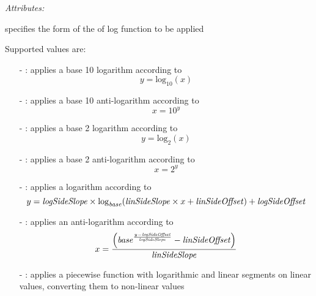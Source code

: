 \emph{Attributes:}
\begin{xmlfields}
	\xmlitem[style][required] specifies the form of the of log function to be applied \par
	Supported values are: 
	    \begin{itemize}
            \item[-] : applies a base 10 logarithm according to
            	\begin{equation}
					y = \text{log}_{10}(x)
				\end{equation}
				
            \item[-] : applies a base 10 anti-logarithm according to
				\begin{equation}
					x = 10^{y}
				\end{equation}
				
            \item[-] : applies a base 2 logarithm according to
				\begin{equation}
					y = \text{log}_{2}(x)
				\end{equation}
				
            \item[-] : applies a base 2 anti-logarithm according to
				\begin{equation}
					x = 2^{y}
				\end{equation}
            
            \item[-] : applies a logarithm according to
                \begin{equation} \label{eq:linToLog}
                    y = \text{\emph{logSideSlope}} \times \text{log}_{\text{\emph{base}}}( \text{\emph{linSideSlope}} \times x + \text{\emph{linSideOffset}}) + \text{\emph{logSideOffset}}
                \end{equation}            
            
            \item[-] : applies an anti-logarithm according to
                \begin{equation} \label{eq:logToLin}
                    x = \frac{\left(\text{\emph{base}}^{\frac{y-\text{\emph{logSideOffset}}}{\text{\emph{logSideSlope}}}} - \text{\emph{linSideOffset}}\right)}{\text{\emph{linSideSlope}}}
                \end{equation}
            
            \item[-] : applies a piecewise function with logarithmic and linear segments on linear values, converting them to non-linear values \par


\end{itemize}
\end{xmlfields}
